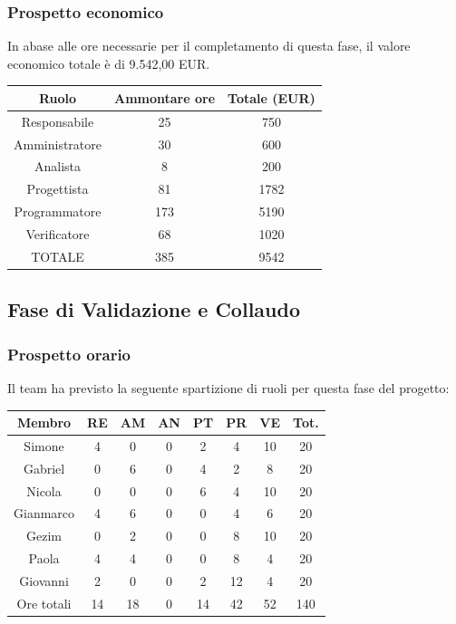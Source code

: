 \subsubsection{Prospetto economico}
In abase alle ore necessarie per il completamento di questa fase, il valore economico totale è di 9.542,00 EUR.
\begin{center}
\begin{tabular}{ |c|c|c|  }
 \hline
 Ruolo 		& Ammontare ore 	& Totale (EUR)\\
 	\hline
 \hline
 	Responsabile	& 25 		& 750\\
	Amministratore	& 30		& 600\\
	Analista		& 8 	& 200\\
	Progettista		& 81		& 1782\\
	Programmatore	& 173		& 5190\\
	Verificatore	& 68 	& 1020\\
 \hline\hline
 TOTALE		& 385		& 9542\\
  \hline
\end{tabular}
\end{center}

\newpage
\subsection{Fase di Validazione e Collaudo}
\subsubsection{Prospetto orario}
Il team ha previsto la seguente spartizione di ruoli per questa fase del progetto:
\\
\begin{center}
\begin{tabular}{ |c|c|c|c|c|c|c|c|  }
 \hline
 Membro 		& RE 	& AM 	& AN 	& PT 	& PR 	& VE 	& Tot.\\
 \hline\hline
 Simone			& 4 		& 0		& 0 	& 2 		& 4 		& 10 		& 20\\
 Gabriel		& 0 		& 6 		& 0 	& 4		& 2 		& 8 		& 20\\
 Nicola			& 0 		& 0 		& 0 	& 6 		& 4 		& 10 		& 20\\
 Gianmarco		& 4 		& 6 		& 0 	& 0	 	& 4 		& 6 		& 20\\
 Gezim			& 0 		& 2 		& 0 	& 0 		& 8 		& 10	 	& 20\\
 Paola			& 4 		& 4 		& 0 	& 0 		& 8 		& 4 		& 20\\
 Giovanni		& 2 		& 0	 	& 0 	& 2 		& 12 	& 4  	& 20\\
 \hline\hline
 Ore totali		& 14		& 18		& 0 	& 14	 	& 42 	& 52 	& 140\\
  \hline
\end{tabular}
\end{center}

